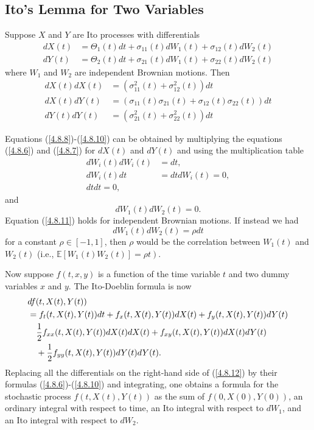 \documentclass[\topdir/lecture\_notes.tex]{subfiles}
\begin{document}
\subsection{Ito's Lemma for Two Variables}
Suppose $X$ and $Y$ are Ito processes with differentials
\begin{align}
d X(t) & =\Theta_{1}(t) d t+\sigma_{11}(t) d W_{1}(t)+\sigma_{12}(t) d W_{2}(t)  \label{4.8.6}\\
d Y(t) & =\Theta_{2}(t) d t+\sigma_{21}(t) d W_{1}(t)+\sigma_{22}(t) d W_{2}(t)
 \label{4.8.7}
\end{align}
where $W_{1}$ and $W_{2}$ are independent Brownian motions. Then
\begin{align}
d X(t) d X(t) & =\left(\sigma_{11}^{2}(t)+\sigma_{12}^{2}(t)\right) d t  \label{4.8.8}\\
d X(t) d Y(t) & =\left(\sigma_{11}(t) \sigma_{21}(t)+\sigma_{12}(t) \sigma_{22}(t)\right) d t  \label{4.8.9}\\
d Y(t) d Y(t) & =\left(\sigma_{21}^{2}(t)+\sigma_{22}^{2}(t)\right) d t
\label{4.8.10}
\end{align} 

Equations (\ref{4.8.8})-(\ref{4.8.10}) can be obtained by multiplying the equations (\ref{4.8.6}) and (\ref{4.8.7}) for $dX(t)$ and $dY(t)$ and using the multiplication table
\begin{align*}
d W_{i}(t) d W_{i}(t)&=d t,\\
d W_{i}(t) d t&=d t d W_{i}(t)=0,\\
d t d t=0,
\end{align*}
and
\begin{equation}
d W_{1}(t) d W_{2}(t)=0. \label{4.8.11}
\end{equation}
Equation (\ref{4.8.11}) holds for independent Brownian motions. If instead we had
\begin{equation*}
d W_{1}(t) d W_{2}(t)=\rho d t
\end{equation*}
for a constant $\rho \in[-1,1]$, then $\rho$ would be the correlation between $W_{1}(t)$ and $W_{2}(t)$ (i.e., $\left.\mathbb{E}\left[W_{1}(t) W_{2}(t)\right]=\rho t\right)$.

Now suppose $f(t, x, y)$ is a function of the time variable $t$ and two dummy variables $x$ and $y$. The Ito-Doeblin formula is now
\begin{align}
& d f(t, X(t), Y(t)) \notag \\
& =f_{t}(t, X(t), Y(t)) d t+f_{x}(t, X(t), Y(t)) d X(t)+f_{y}(t, X(t), Y(t)) d Y(t) \notag\\
& \quad \frac{1}{2} f_{x x}(t, X(t), Y(t)) d X(t) d X(t)+f_{x y}(t, X(t), Y(t)) d X(t) d Y(t) \notag\\
& \quad+\frac{1}{2} f_{y y}(t, X(t), Y(t)) d Y(t) d Y(t).
\label{4.8.12}
\end{align}
Replacing all the differentials on the right-hand side of (\ref{4.8.12}) by their formulas (\ref{4.8.6})-(\ref{4.8.10}) and integrating, one obtains a formula for the stochastic process $f(t, X(t), Y(t))$ as the sum of $f(0, X(0), Y(0))$, an ordinary integral with respect to time, an Ito integral with respect to $dW_{1}$, and an Ito integral with respect to $dW_{2}$.
\end{document}
